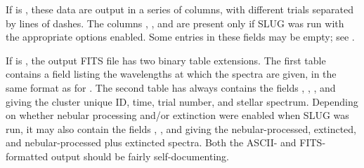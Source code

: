 \documentclass[letterpaper,10pt,english]{sphinxmanual}
\begin{document}
If  is , these data are output in a series of columns, with different trials separated by lines of dashes. The columns , , and  are present only if SLUG was run with the appropriate options enabled. Some entries in these fields may be empty; see {\hyperref[\detokenize{output:ssec-int-spec-file}]{}}.

If  is , the output FITS file has two binary table extensions. The first table contains a field listing the wavelengths at which the spectra are given, in the same format as for {\hyperref[\detokenize{output:ssec-int-spec-file}]{}}. The second table has always contains the fields , , , and  giving the cluster unique ID, time, trial number, and stellar spectrum. Depending on whether nebular processing and/or extinction were enabled when SLUG was run, it may also contain the fields , , and  giving the nebular-processed, extincted, and nebular-processed plus extincted spectra. Both the ASCII- and FITS-formatted output should be fairly self-documenting.
\end{document}
